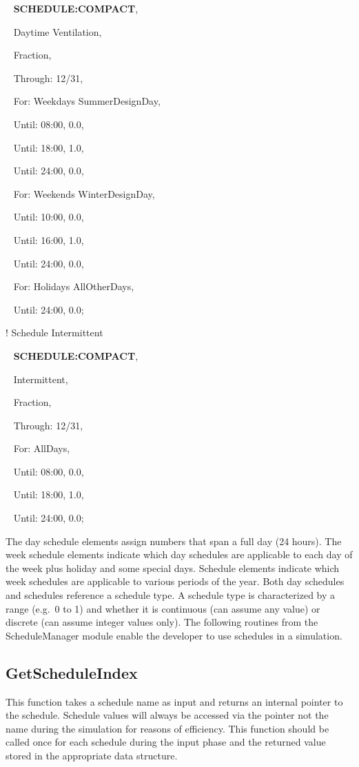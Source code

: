 ~ \textbf{SCHEDULE:COMPACT},

~ Daytime Ventilation,

~ Fraction,

~ Through: 12/31,

~ For: Weekdays SummerDesignDay,

~ Until: 08:00, 0.0,

~ Until: 18:00, 1.0,

~ Until: 24:00, 0.0,

~ For: Weekends WinterDesignDay,

~ Until: 10:00, 0.0,

~ Until: 16:00, 1.0,

~ Until: 24:00, 0.0,

~ For: Holidays AllOtherDays,

~ Until: 24:00, 0.0;

! Schedule Intermittent

~ \textbf{SCHEDULE:COMPACT},

~ Intermittent,

~ Fraction,

~ Through: 12/31,

~ For: AllDays,

~ Until: 08:00, 0.0,

~ Until: 18:00, 1.0,

~ Until: 24:00, 0.0;

The day schedule elements assign numbers that span a full day (24 hours). The week schedule elements indicate which day schedules are applicable to each day of the week plus holiday and some special days. Schedule elements indicate which week schedules are applicable to various periods of the year. Both day schedules and schedules reference a schedule type. A schedule type is characterized by a range (e.g.~0 to 1) and whether it is continuous (can assume any value) or discrete (can assume integer values only). The following routines from the ScheduleManager module enable the developer to use schedules in a simulation.

\subsection{GetScheduleIndex}\label{getscheduleindex}

This function takes a schedule name as input and returns an internal pointer to the schedule. Schedule values will always be accessed via the pointer not the name during the simulation for reasons of efficiency. This function should be called once for each schedule during the input phase and the returned value stored in the appropriate data structure.

